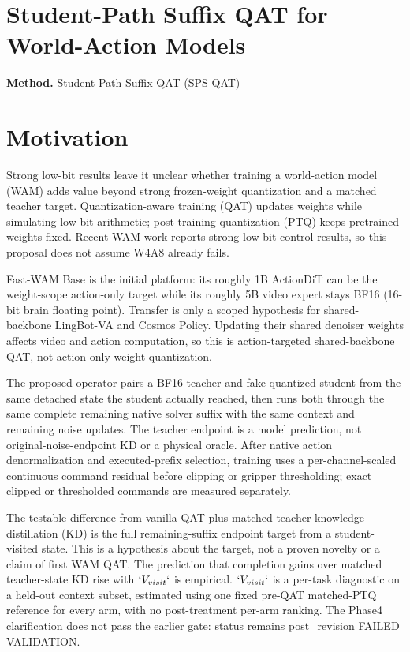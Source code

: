 \documentclass[10pt,a4paper]{article}
\begin{document}
\section*{Student-Path Suffix QAT for World-Action Models}
\textbf{Method.} Student-Path Suffix QAT (SPS-QAT)
\section*{Motivation}
Strong low-bit results leave it unclear whether training a world-action model (WAM) adds value beyond strong frozen-weight quantization and a matched teacher target. Quantization-aware training (QAT) updates weights while simulating low-bit arithmetic;\allowbreak{} post-training quantization (PTQ) keeps pretrained weights fixed. Recent WAM work reports strong low-bit control results, so this proposal does not assume W4A8 already fails.

Fast-WAM Base is the initial platform: its roughly 1B ActionDiT can be the weight-scope action-only target while its roughly 5B video expert stays BF16 (16-bit brain floating point). Transfer is only a scoped hypothesis for shared-backbone LingBot-VA and Cosmos Policy. Updating their shared denoiser weights affects video and action computation, so this is action-targeted shared-backbone QAT, not action-only weight quantization.

The proposed operator pairs a BF16 teacher and fake-quantized student from the same detached state the student actually reached, then runs both through the same complete remaining native solver suffix with the same context and remaining noise updates. The teacher endpoint is a model prediction, not original-noise-endpoint KD or a physical oracle. After native action denormalization and executed-prefix selection, training uses a per-channel-scaled continuous command residual before clipping or gripper thresholding;\allowbreak{} exact clipped or thresholded commands are measured separately.

The testable difference from vanilla QAT plus matched teacher knowledge distillation (KD) is the full remaining-suffix endpoint target from a student-visited state. This is a hypothesis about the target, not a proven novelty or a claim of first WAM QAT. The prediction that completion gains over matched teacher-state KD rise with \(`V_{visit}`\) is empirical. \(`V_{visit}`\) is a per-task diagnostic on a held-out context subset, estimated using one fixed pre-QAT matched-PTQ reference for every arm, with no post-treatment per-arm ranking. The Phase4 clarification does not pass the earlier gate: status remains post\_revision FAILED VALIDATION.
\end{document}
